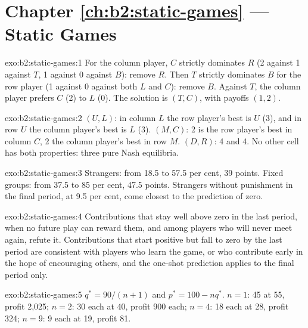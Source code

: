 \section*{Chapter \ref{ch:b2:static-games} --- Static Games}

\begin{solution}{exo:b2:static-games:1}
For the column player, $C$ strictly dominates $R$ (2 against 1 against $T$, 1 against 0 against $B$): remove $R$. Then
$T$ strictly dominates $B$ for the row player (1 against 0 against both $L$ and $C$): remove $B$. Against $T$, the column
player prefers $C$ (2) to $L$ (0). The solution is $(T, C)$, with payoffs $(1, 2)$.
\end{solution}

\begin{solution}{exo:b2:static-games:2}
$(U, L)$: in column $L$ the row player's best is $U$ (3), and in row $U$ the column player's best is $L$ (3). $(M, C)$: 2 is
the row player's best in column $C$, 2 the column player's best in row $M$. $(D, R)$: 4 and 4. No other cell has both
properties: three pure Nash equilibria.
\end{solution}

\begin{solution}{exo:b2:static-games:3}
Strangers: from 18.5 to 57.5 per cent, 39 points. Fixed groups: from 37.5 to 85 per cent, 47.5 points. Strangers
without punishment in the final period, at 9.5 per cent, come closest to the prediction of zero.
\end{solution}

\begin{solution}{exo:b2:static-games:4}
Contributions that stay well above zero in the last period, when no future play can reward them, and among
players who will never meet again, refute it. Contributions that start positive but fall to zero by the last
period are consistent with players who learn the game, or who contribute early in the hope of encouraging
others, and the one-shot prediction applies to the final period only.
\end{solution}

\begin{solution}{exo:b2:static-games:5}
$q^* = 90/(n + 1)$ and $p^* = 100 - nq^*$. $n = 1$: 45 at 55, profit 2{,}025; $n = 2$: 30 each at 40, profit 900 each; $n = 4$: 18 each
at 28, profit 324; $n = 9$: 9 each at 19, profit 81.
\end{solution}


